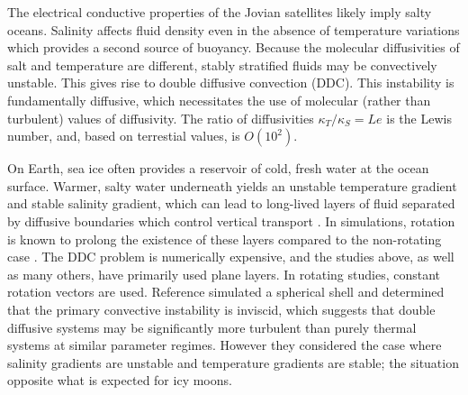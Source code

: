 \documentclass{article}
\begin{document}
The electrical conductive properties of the Jovian satellites likely imply salty oceans\citep{cZ00}.
Salinity affects fluid density even in the absence of temperature variations which provides a second source of buoyancy. 
Because the molecular diffusivities of salt and temperature are different, stably stratified fluids may be convectively unstable. 
This gives rise to double diffusive convection (DDC)\citep{sK66,tR13}.
This instability is fundamentally diffusive, which necessitates the use of molecular (rather than turbulent) values of diffusivity.
The ratio of diffusivities $\kappa_T/ \kappa_S=Le$ is the Lewis number, and, based on terrestial values, is $O(10^2)$.

On Earth, sea ice often provides a reservoir of cold, fresh water at the ocean surface. 
Warmer, salty water underneath yields an unstable temperature gradient and stable salinity gradient, which can lead to long-lived layers of fluid separated by diffusive boundaries which control vertical transport \citep{mT08,jT73,jT02}. 
In simulations, rotation is known to prolong the existence of these layers compared to the non-rotating case \citep{jF24}.
The DDC problem is numerically expensive, and the studies above, as well as many others, have primarily used plane layers. In rotating studies, constant rotation vectors are used\citep{gM12,rM17}.  
Reference \citep{rM19} simulated a spherical shell and determined that the primary convective instability is inviscid, which suggests that double diffusive systems may be significantly more turbulent than purely thermal systems at similar parameter regimes. However they considered the case where salinity gradients are unstable and temperature gradients are stable; the situation opposite what is expected for icy moons.
\end{document}
